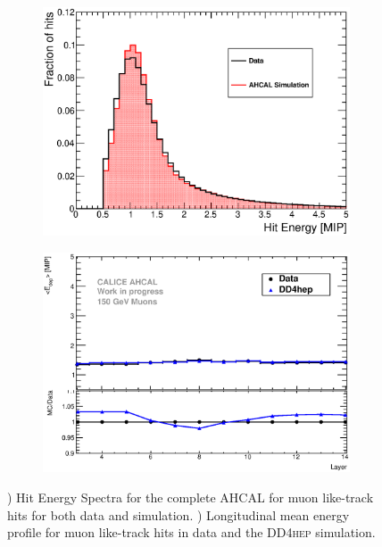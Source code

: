 \documentclass{JINST}
\newcommand\ddhep{\textsc{DD4hep}\xspace}
\begin{document}
\begin{figure}[htbp!]
  \centering
  \begin{subfigure}[t]{0.49\textwidth}
    \includegraphics[width=1\linewidth]{fig/ComparisonMCData_MIPPeak.eps}
    \caption{} \label{fig:MIPData_MC}
  \end{subfigure}
  \hfill
  \begin{subfigure}[t]{0.49\textwidth}
    \includegraphics[width=1\linewidth]{fig/ProfileMuons_Edep_DD4hep.eps}
    \caption{} \label{fig:ProfileMIP_Edep}
  \end{subfigure}
  \caption{) Hit Energy Spectra for the complete AHCAL for muon like-track hits for both data and simulation. ) Longitudinal mean energy profile for muon like-track hits in data and the \ddhep simulation.}
  \label{fig:Val}
\end{figure}
\end{document}
